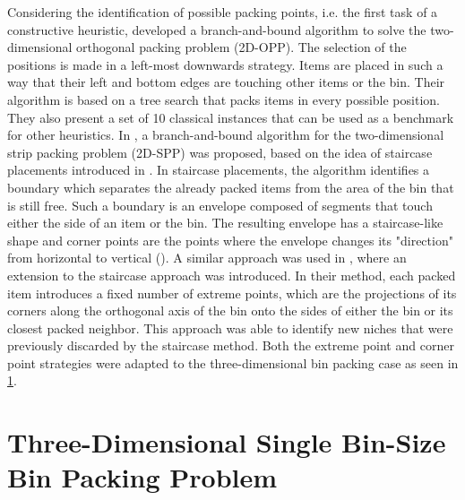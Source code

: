 Considering the identification of possible packing points, i.e. the first task of a constructive heuristic, \cite{Martello1998} developed a branch-and-bound algorithm to solve the two-dimensional orthogonal packing problem (2D-OPP).
The selection of the positions is made in a left-most downwards strategy. Items are placed in such a way that their left and bottom edges are touching other items or the bin.
Their algorithm is based on a tree search that packs items in every possible position.
They also present a set of 10 classical instances that can be used as a benchmark for other heuristics.
In \cite{martello2003exact}, a branch-and-bound algorithm for the two-dimensional strip packing problem (2D-SPP) was proposed, based on the idea of staircase placements introduced in \cite{scheithauer1995equivalence}.
In staircase placements, the algorithm identifies a boundary which separates the already packed items from the area of the bin that is still free.
Such a boundary is an envelope composed of segments that touch either the side of an item or the bin.
The resulting envelope has a staircase-like shape and corner points are the points where the envelope changes its "direction" from horizontal to vertical (\cite{martello2000three}).
A similar approach was used in \cite{crainic2008extreme}, where an extension to the staircase approach was introduced.
In their method, each packed item introduces a fixed number of extreme points, which are the projections of its corners along the orthogonal axis of the bin onto the sides of either the bin or its closest packed neighbor.
This approach was able to identify new niches that were previously discarded by the staircase method.
Both the extreme point and corner point strategies were adapted to the three-dimensional bin packing case as seen in \cref{sec:literature:3dbpp}.

\section{Three-Dimensional Single Bin-Size Bin Packing Problem}
\label{sec:literature:3dbpp}%

